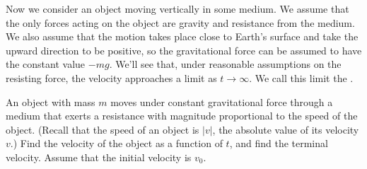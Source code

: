 Now we consider an object moving vertically in some medium. We assume
that the only forces acting on the object are gravity and resistance
from the medium. We also assume that the motion takes place close to
Earth's surface and take the upward direction to be positive, so
 the gravitational force can be assumed to have the constant value
 $-mg$. We'll see that, under reasonable assumptions on the
resisting force, the velocity approaches a limit as $t\to\infty$.
We call this limit the .

\begin{example}\label{example:4.3.1}
An object with mass $m$ moves under constant gravitational force
through a medium that exerts a resistance with magnitude proportional
to the speed of the object. (Recall that the speed of an object is
$|v|$, the absolute value of its velocity $v$.) Find the velocity of
the object as a function of $t$, and find the terminal velocity.
Assume  that the initial velocity is $v_0$.
 \end{example}

